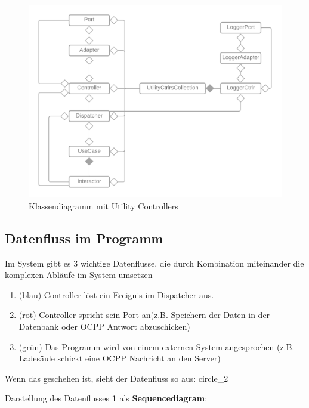 \documentclass{article}
\begin{document}
    \begin{figure}[H]
        \centering
        \includegraphics[width=12cm]{./images/KlassendiagramMitUtilityControllers.png}
         \caption[Klassendiagramm mit Utility Controllers]{Klassendiagramm mit Utility Controllers \footnotemark}
         \label{fig:CDControllerWithUtility}
    \end{figure}



    \newpage
    \subsection{Datenfluss im Programm}
    Im System gibt es 3 wichtige Datenflusse, die durch Kombination miteinander die komplexen Abläufe im System umsetzen
    \begin{enumerate}
        \item (blau) Controller löst ein Ereignis im Dispatcher aus.
        \item (rot) Controller spricht sein Port an(z.B. Speichern der Daten in der Datenbank oder OCPP Antwort abzuschicken)
        \item (grün) Das Programm wird von einem externen System angesprochen (z.B. Ladesäule schickt eine OCPP Nachricht an den Server) 
    \end{enumerate}
    Wenn das geschehen ist, sieht der Datenfluss so aus:
    {circle_2}

    \newpage
    Darstellung des Datenflusses \textbf{1} als \textbf{Sequencediagram}:
\end{document}

